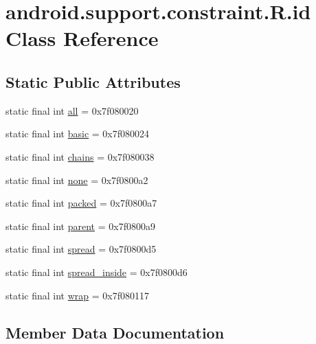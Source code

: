 \hypertarget{classandroid_1_1support_1_1constraint_1_1R_1_1id}{}\section{android.\+support.\+constraint.\+R.\+id Class Reference}
\label{classandroid_1_1support_1_1constraint_1_1R_1_1id}
\subsection*{Static Public Attributes}
\begin{DoxyCompactItemize}
\item 
static final int \mbox{\hyperlink{classandroid_1_1support_1_1constraint_1_1R_1_1id_aea0787d90242ff600326d61d470a83f7}{all}} = 0x7f080020
\item 
static final int \mbox{\hyperlink{classandroid_1_1support_1_1constraint_1_1R_1_1id_a8a7dca908a299e16c3c1e5e35fe5fcf5}{basic}} = 0x7f080024
\item 
static final int \mbox{\hyperlink{classandroid_1_1support_1_1constraint_1_1R_1_1id_aa18f9e706161916b0e2fe50b9af0a42f}{chains}} = 0x7f080038
\item 
static final int \mbox{\hyperlink{classandroid_1_1support_1_1constraint_1_1R_1_1id_acb2e5557c4f8d835a63873863917b5cf}{none}} = 0x7f0800a2
\item 
static final int \mbox{\hyperlink{classandroid_1_1support_1_1constraint_1_1R_1_1id_a6f318bd8cf4a4a7b6bb91ae39aafc8c6}{packed}} = 0x7f0800a7
\item 
static final int \mbox{\hyperlink{classandroid_1_1support_1_1constraint_1_1R_1_1id_ad1010c30c224329a8e25e8b2721b73ff}{parent}} = 0x7f0800a9
\item 
static final int \mbox{\hyperlink{classandroid_1_1support_1_1constraint_1_1R_1_1id_a19ff6e1cce6df7438948c99f48d6a96c}{spread}} = 0x7f0800d5
\item 
static final int \mbox{\hyperlink{classandroid_1_1support_1_1constraint_1_1R_1_1id_abe08ca72966af7af713a9537e4a0ff48}{spread\+\_\+inside}} = 0x7f0800d6
\item 
static final int \mbox{\hyperlink{classandroid_1_1support_1_1constraint_1_1R_1_1id_ae0562e247c624b01fdf91a6e003f141d}{wrap}} = 0x7f080117
\end{DoxyCompactItemize}


\subsection{Member Data Documentation}
\mbox{\label{classandroid_1_1support_1_1constraint_1_1R_1_1id_aea0787d90242ff600326d61d470a83f7}} 
